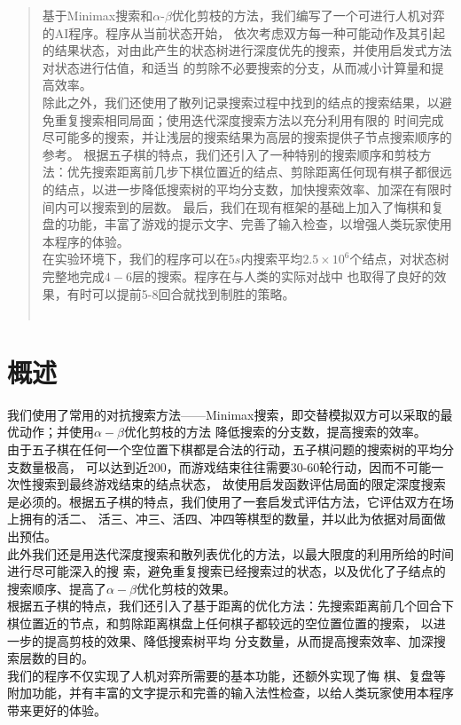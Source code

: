 \documentclass{acm_proc_article-sp}
\begin{document}
\begin{abstract}
基于Minimax搜索和$\alpha$-$\beta$优化剪枝的方法，我们编写了一个可进行人机对弈的AI程序。程序从当前状态开始，
依次考虑双方每一种可能动作及其引起的结果状态，对由此产生的状态树进行深度优先的搜索，并使用启发式方法对状态进行估值，和适当
的剪除不必要搜索的分支，从而减小计算量和提高效率。\\
除此之外，我们还使用了散列记录搜索过程中找到的结点的搜索结果，以避免重复搜索相同局面；使用迭代深度搜索方法以充分利用有限的
时间完成尽可能多的搜索，并让浅层的搜索结果为高层的搜索提供子节点搜索顺序的参考。
根据五子棋的特点，我们还引入了一种特别的搜索顺序和剪枝方法：优先搜索距离前几步下棋位置近的结点、剪除距离任何现有棋子都很远
的结点，以进一步降低搜索树的平均分支数，加快搜索效率、加深在有限时间内可以搜索到的层数。
最后，我们在现有框架的基础上加入了悔棋和复盘的功能，丰富了游戏的提示文字、完善了输入检查，以增强人类玩家使用本程序的体验。\\
在实验环境下，我们的程序可以在$5s$内搜索平均$2.5\times10^6$个结点，对状态树完整地完成$4-6$层的搜索。程序在与人类的实际对战中
也取得了良好的效果，有时可以提前5-8回合就找到制胜的策略。\\
       \\
\end{abstract}

\section{\textbf{概述}}
我们使用了常用的对抗搜索方法——Minimax搜索，即交替模拟双方可以采取的最优动作；并使用$\alpha-\beta$优化剪枝的方法
降低搜索的分支数，提高搜索的效率。\\
由于五子棋在任何一个空位置下棋都是合法的行动，五子棋问题的搜索树的平均分支数量极高，
可以达到近200，而游戏结束往往需要30-60轮行动，因而不可能一次性搜索到最终游戏结束的结点状态，
故使用启发函数评估局面的限定深度搜索是必须的。根据五子棋的特点，我们使用了一套启发式评估方法，它评估双方在场上拥有的活二、
活三、冲三、活四、冲四等棋型的数量，并以此为依据对局面做出预估。\\
此外我们还是用迭代深度搜索和散列表优化的方法，以最大限度的利用所给的时间进行尽可能深入的搜
索，避免重复搜索已经搜索过的状态，以及优化了子结点的搜索顺序、提高了$\alpha-\beta$优化剪枝的效果。\\
根据五子棋的特点，我们还引入了基于距离的优化方法：先搜索距离前几个回合下棋位置近的节点，和剪除距离棋盘上任何棋子都较远的空位置位置的搜索，
以进一步的提高剪枝的效果、降低搜索树平均
分支数量，从而提高搜索效率、加深搜索层数的目的。\\
我们的程序不仅实现了人机对弈所需要的基本功能，还额外实现了悔
棋、复盘等附加功能，并有丰富的文字提示和完善的输入法性检查，以给人类玩家使用本程序带来更好的体验。\\
\end{document}
